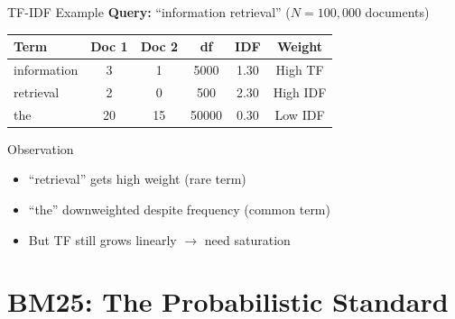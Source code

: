 \documentclass[aspectratio=169]{beamer}
\begin{document}
\begin{frame}{TF-IDF Example}
\textbf{Query:} ``information retrieval'' \quad ($N = 100{,}000$ documents)

\vspace{1em}

\begin{table}
\centering
\small
\begin{tabular}{lccccc}
\toprule
\textbf{Term} & \textbf{Doc 1} & \textbf{Doc 2} & \textbf{df} & \textbf{IDF} & \textbf{Weight} \\
\midrule
information & 3 & 1 & 5000 & 1.30 & High TF \\
retrieval & 2 & 0 & 500 & 2.30 & High IDF \\
the & 20 & 15 & 50000 & 0.30 & Low IDF \\
\bottomrule
\end{tabular}
\end{table}

\vspace{1em}

\begin{block}{Observation}
\begin{itemize}
    \item ``retrieval'' gets high weight (rare term)
    \item ``the'' downweighted despite frequency (common term)
    \item But TF still grows linearly $\rightarrow$ need saturation
\end{itemize}
\end{block}
\end{frame}

\section{BM25: The Probabilistic Standard}

\begin{frame}[plain]
\sectionpage
\end{frame}
\end{document}
